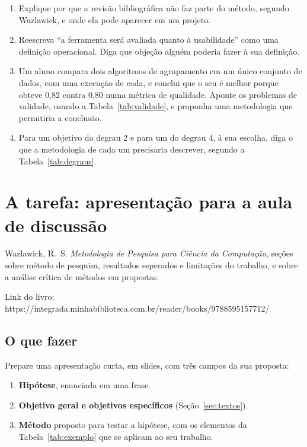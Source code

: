 \documentclass[10pt,a4paper]{extarticle}
\newcommand{\linklivro}{\textcolor{red!70!black}{https://integrada.minhabiblioteca.com.br/reader/books/9788595157712/}}
\theoremstyle{definition}
\begin{document}
\begin{enumerate}[label=\textbf{\arabic*.}, itemsep=0.4em]
  \item Explique por que a revisão bibliográfica não faz parte do método, segundo Wazlawick, e onde ela pode aparecer em um projeto.
  \item Reescreva \enquote{a ferramenta será avaliada quanto à usabilidade} como uma definição operacional. Diga que objeção alguém poderia fazer à sua definição.
  \item Um aluno compara dois algoritmos de agrupamento em um único conjunto de dados, com uma execução de cada, e conclui que o seu é melhor porque obteve 0,82 contra 0,80 numa métrica de qualidade. Aponte os problemas de validade, usando a Tabela~\ref{tab:validade}, e proponha uma metodologia que permitiria a conclusão.
  \item Para um objetivo do degrau 2 e para um do degrau 4, à sua escolha, diga o que a metodologia de cada um precisaria descrever, segundo a Tabela~\ref{tab:degraus}.
\end{enumerate}

\section{A tarefa: apresentação para a aula de discussão}\label{sec:tarefa}

\begin{keybox}
Wazlawick, R.\ S. \emph{Metodologia de Pesquisa para Ciência da Computação}, seções sobre método de pesquisa, resultados esperados e limitações do trabalho, e sobre a análise crítica de métodos em propostas.

Link do livro: \linklivro
\end{keybox}

\subsection{O que fazer}

Prepare uma apresentação curta, em slides, com três campos da sua proposta:
\begin{enumerate}[label=\textbf{\arabic*.}]
  \item \textbf{Hipótese}, enunciada em uma frase.
  \item \textbf{Objetivo geral e objetivos específicos} (Seção~\ref{sec:textos}).
  \item \textbf{Método} proposto para testar a hipótese, com os elementos da Tabela~\ref{tab:exemplo} que se aplicam ao seu trabalho.
\end{enumerate}
\end{document}
